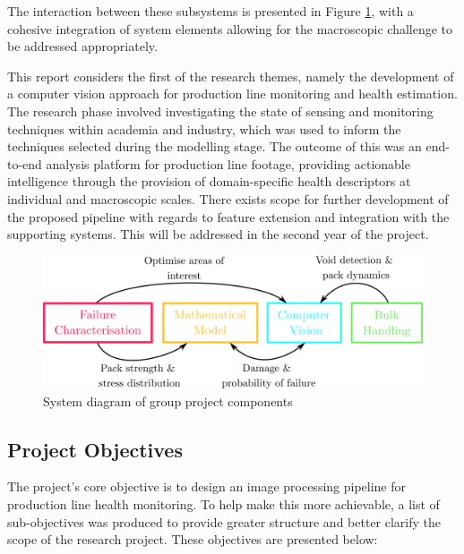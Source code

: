 \documentclass[10pt]{article}
\begin{document}
\noindent The interaction between these subsystems is presented in Figure \ref{fig:SystemDiagram}, with a cohesive integration of system elements allowing for the macroscopic challenge to be addressed appropriately. 

This report considers the first of the research themes, namely the development of a computer vision approach for production line monitoring and health estimation. The research phase involved investigating the state of sensing and monitoring techniques within academia and industry, which was used to inform the techniques selected during the modelling stage. The outcome of this was an end-to-end analysis platform for production line footage, providing actionable intelligence through the provision of domain-specific health descriptors at individual and macroscopic scales. There exists scope for further development of the proposed pipeline with regards to feature extension and integration with the supporting systems. This will be addressed in the second year of the project.

\vfill
\begin{figure}[h!]
\centering
\includegraphics[width=1.0\linewidth]{images/System_Diagram.png}
\caption{System diagram of group project components}
\label{fig:SystemDiagram}
\end{figure}
\vfill

\clearpage
\subsection{Project Objectives}
The project's core objective is to design an image processing pipeline for production line health monitoring. To help make this more achievable, a list of sub-objectives was produced to provide greater structure and better clarify the scope of the research project. These objectives are presented below:
\end{document}

